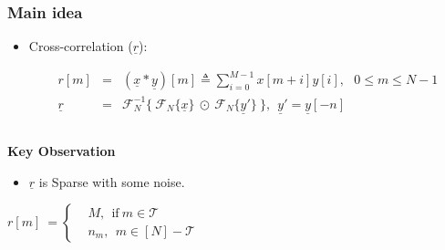 \documentclass[10pt,xcolor=table]{beamer}
\newcommand{\defeq}{\triangleq}
\newcommand{\xv}{\underline{x}}
\newcommand{\yv}{\underline{y}}
\newcommand{\rv}{\underline{r}}
\begin{document}
\begin{frame}\frametitle{Main idea}
	\vspace{-0.4cm}
			\begin{block}{}
			
				\begin{itemize}
					\item {Cross-correlation} ($\rv$):
					
                    \begin{eqnarray}
                    \nonumber
					r[m] & = & (\xv*\yv)[m] \defeq \sum_{i=0}^{M-1} x[m+i] y[i], ~ ~ \ 0 \leq m \leq N-1\\
                    \nonumber
					\rv  & = & \mathcal{F}_{N}^{-1} \{~  \mathcal{F}_{N}\{\xv\} ~ \odot ~  \mathcal{F}_{N}\{\yv'\} ~ \}, \ \ \yv' = \yv[-n]
					\end{eqnarray}					
				\end{itemize}
			\end{block}
			
				\begin{columns}
			\begin{block}{\alert{ \bf Key Observation}}
			\vspace{0.2cm}
				\begin{itemize}
					\item $\rv$ is {\color{blue}Sparse} with some noise.
				\end{itemize}
				 \begin{equation} \label{eqn:RXY_sparse}\nonumber
				 r[m] \ = \left\{
				 \begin{array}{ll}
				 &M,~~  \text{if} \ m \in \mathcal{T} \\
				 & n_m,~~ m \in [N]-\mathcal{T}
				 \end{array}
				 \right.  			
				 \end{equation}
			\end{block}
						
					\begin{figure}
						\centering
						\scalebox{0.35}{}
					\end{figure}
					
				\end{columns}
				
					
\end{frame}
\def\fracty{0.45}
\def\fractx{0.8}
\end{document}
